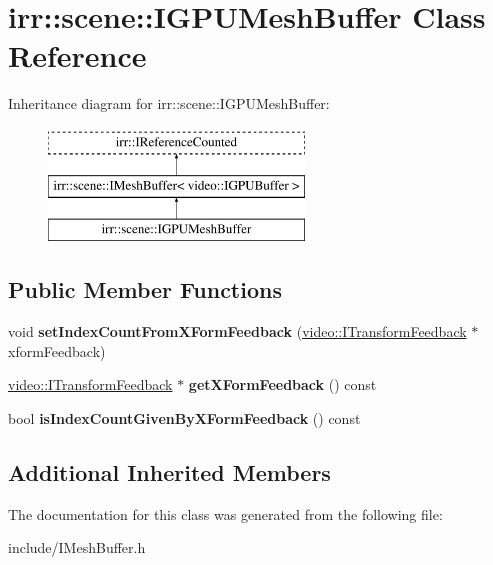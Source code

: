 \hypertarget{classirr_1_1scene_1_1IGPUMeshBuffer}{}\section{irr\+:\+:scene\+:\+:I\+G\+P\+U\+Mesh\+Buffer Class Reference}
\label{classirr_1_1scene_1_1IGPUMeshBuffer}
Inheritance diagram for irr\+:\+:scene\+:\+:I\+G\+P\+U\+Mesh\+Buffer\+:\begin{figure}[H]
\begin{center}
\leavevmode
\includegraphics[height=3.000000cm]{classirr_1_1scene_1_1IGPUMeshBuffer}
\end{center}
\end{figure}
\subsection*{Public Member Functions}
\begin{DoxyCompactItemize}
\item 
void {\bfseries set\+Index\+Count\+From\+X\+Form\+Feedback} (\hyperlink{classirr_1_1video_1_1ITransformFeedback}{video\+::\+I\+Transform\+Feedback} $\ast$xform\+Feedback)\hypertarget{classirr_1_1scene_1_1IGPUMeshBuffer_ac81c7da4bca1be4a1c460e68e4de1dab}{}\label{classirr_1_1scene_1_1IGPUMeshBuffer_ac81c7da4bca1be4a1c460e68e4de1dab}

\item 
\hyperlink{classirr_1_1video_1_1ITransformFeedback}{video\+::\+I\+Transform\+Feedback} $\ast$ {\bfseries get\+X\+Form\+Feedback} () const \hypertarget{classirr_1_1scene_1_1IGPUMeshBuffer_a6d41e55265ae0b5e58cff757d05f4495}{}\label{classirr_1_1scene_1_1IGPUMeshBuffer_a6d41e55265ae0b5e58cff757d05f4495}

\item 
bool {\bfseries is\+Index\+Count\+Given\+By\+X\+Form\+Feedback} () const \hypertarget{classirr_1_1scene_1_1IGPUMeshBuffer_a43da010520a35eb4ea1a3d640098ab30}{}\label{classirr_1_1scene_1_1IGPUMeshBuffer_a43da010520a35eb4ea1a3d640098ab30}

\end{DoxyCompactItemize}
\subsection*{Additional Inherited Members}


The documentation for this class was generated from the following file\+:\begin{DoxyCompactItemize}
\item 
include/I\+Mesh\+Buffer.\+h\end{DoxyCompactItemize}
